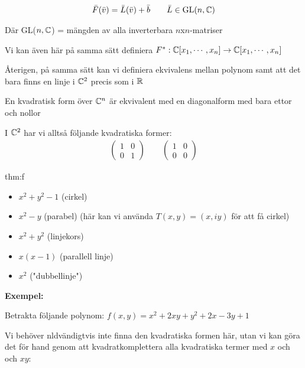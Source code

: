 \begin{equation*}
  \begin{gathered}
    \bar{F}(\bar{v}) = \bar{L}(\bar{v})+\bar{b}\qquad\bar{L}\in\text{GL}(n,\mathbb{C})
  \end{gathered}
\end{equation*}
\par\bigskip
\noindent Där GL($n,\mathbb{C}$) = mängden av alla inverterbara $n$x$n$-matriser
\par\bigskip
\noindent Vi kan även här på samma sätt definiera $F^*:\mathbb{C}[x_1,\cdots,x_n]\to\mathbb{C}[x_1,\cdots,x_n]$ 
\par\bigskip
\noindent Återigen, på samma sätt kan vi definiera ekvivalens mellan polynom samt att det bara finns en linje i $\mathbb{C}^2$ precis som i $\mathbb{R}$ 
\par\bigskip
\noindent En kvadratisk form över $\mathbb{C}^n$ är ekvivalent med en diagonalform med bara ettor och nollor\par
\noindent I $\mathbb{C}^2$ har vi alltså följande kvadratiska former:
\begin{equation*}
  \begin{gathered}
    \begin{pmatrix}1&0\\0&1\end{pmatrix}\qquad\begin{pmatrix}1&0\\0&0\end{pmatrix}
  \end{gathered}
\end{equation*}
\par\bigskip
\begin{theo}{thm:f}
  \begin{itemize}
    \item $x^2+y^2-1$ (cirkel)
    \item $x^2-y$ (parabel) (här kan vi använda $T(x,y) = (x,iy)$ för att få cirkel)
    \item $x^2+y^2$ (linjekors)
    \item $x(x-1)$ (parallell linje)
    \item $x^2$ ("dubbellinje")
  \end{itemize}
\end{theo}
\par\bigskip
\noindent\textbf{Exempel:}\par
\noindent Betrakta följande polynom: $f(x,y) = x^2+2xy+y^2+2x-3y+1$\par
\noindent Vi behöver nldvändigtvis inte finna den kvadratiska formen här, utan vi kan göra det för hand genom att kvadratkomplettera alla kvadratiska termer med $x$ och och $xy$:
